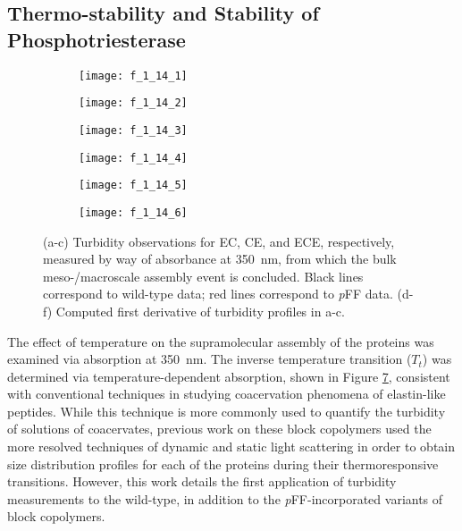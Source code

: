 \begin{refsection}
\subsection{Thermo-stability and Stability of Phosphotriesterase}
\label{sec:lcst}
\begin{figure}[h!]
    \centering
    \begin{subfigure}[b]{0.32\textwidth}
        \texttt{[image: f\_1\_14\_1]}
        \caption{}
        \label{fig:LCST_ECpFF}
    \end{subfigure}
    \begin{subfigure}[b]{0.32\textwidth}
        \texttt{[image: f\_1\_14\_2]}
        \caption{}
        \label{fig:LCST_CEpFF}
    \end{subfigure}
    \begin{subfigure}[b]{0.32\textwidth}
        \texttt{[image: f\_1\_14\_3]}
        \caption{}
        \label{fig:LCST_ECEpFF}
    \end{subfigure}

    \begin{subfigure}[b]{0.32\textwidth}
        \texttt{[image: f\_1\_14\_4]}
        \caption{}
        \label{fig:LCST_deriv_ECpFF}
    \end{subfigure}
    \begin{subfigure}[b]{0.32\textwidth}
        \texttt{[image: f\_1\_14\_5]}
        \caption{}
        \label{fig:LCST_deriv_CEpFF}
    \end{subfigure}
    \begin{subfigure}[b]{0.32\textwidth}
        \texttt{[image: f\_1\_14\_6]}
        \caption{}
        \label{fig:LCST_deriv_ECEpFF}
    \end{subfigure}
    \caption{(a-c) Turbidity observations for EC, CE, and ECE, respectively,
        measured by way of absorbance at \SI{350}{\nm}, from which the bulk
        meso-/macroscale assembly event is concluded. Black lines
        correspond to wild-type data; red lines correspond to \emph{p}FF data. (d-f)
    Computed first derivative of turbidity profiles in a-c.}
    \label{fig:lcst}
\end{figure}
The effect of temperature on the supramolecular assembly of the proteins was
examined via absorption at \SI{350}{\nm}. The inverse temperature transition
(${T_t}$) was determined via temperature-dependent absorption, shown in Figure
\ref{fig:lcst}, consistent with conventional techniques in studying coacervation
phenomena of elastin-like peptides.\cite{Urry1985} While this technique is more
commonly used to quantify the turbidity of solutions of coacervates, previous
work on these block copolymers used the more resolved techniques of dynamic and
static light scattering in order to obtain size distribution profiles for each
of the proteins during their thermoresponsive transitions. However, this work
details the first application of turbidity measurements to the
wild-type, in addition to the \emph{p}FF-incorporated variants of block copolymers.


\end{refsection}

